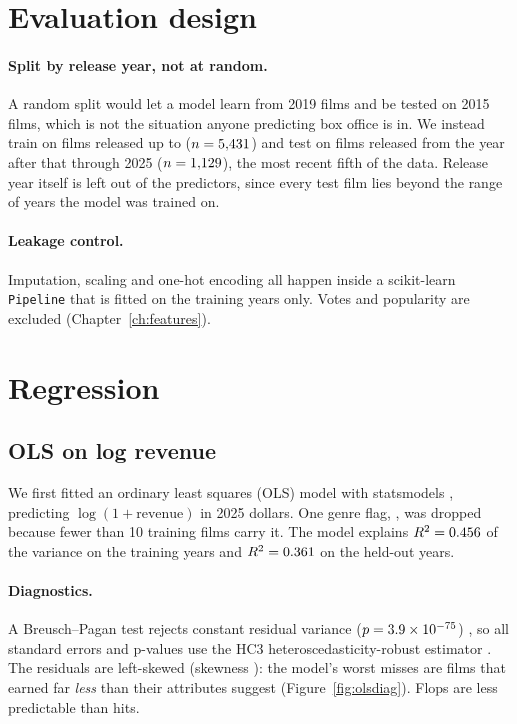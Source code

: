 \documentclass[a4paper,12pt]{report}
\newcommand{\code}[1]{\texttt{#1}}
\begin{document}
\section{Evaluation design}\label{sec:split}

\paragraph{Split by release year, not at random.} A random split would let a model learn from 2019 films and be tested on 2015 films, which is not the situation anyone predicting box office is in. We instead train on films released up to \ModelSplitYear{} ($n=5{,}431$) and test on films released from the year after that through 2025 ($n=1{,}129$), the most recent fifth of the data. Release year itself is left out of the predictors, since every test film lies beyond the range of years the model was trained on.

\paragraph{Leakage control.} Imputation, scaling and one-hot encoding all happen inside a scikit-learn \code{Pipeline} \cite{sklearn} that is fitted on the training years only. Votes and popularity are excluded (Chapter~\ref{ch:features}).

\section{Regression}

\subsection{OLS on log revenue}

We first fitted an ordinary least squares (OLS) model with statsmodels \cite{statsmodels}, predicting $\log(1+\text{revenue})$ in 2025 dollars. One genre flag, \code{\ModelOlsDroppedDegenerate}, was dropped because fewer than 10 training films carry it. The model explains $R^2=0.456$ of the variance on the training years and $R^2=0.361$ on the held-out years.

\paragraph{Diagnostics.} A Breusch--Pagan test rejects constant residual variance ($p=3.9\times10^{-75}$) \cite{breusch}, so all standard errors and p-values use the HC3 heteroscedasticity-robust estimator \cite{hc3}. The residuals are left-skewed (skewness \ModelOlsResidSkew): the model's worst misses are films that earned far \emph{less} than their attributes suggest (Figure~\ref{fig:olsdiag}). Flops are less predictable than hits.
\end{document}
